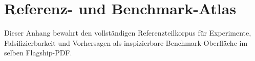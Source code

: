 \section{Referenz- und Benchmark-Atlas}
\label{sec:oc-core-1-3-reference-benchmark-atlas}

Dieser Anhang bewahrt den vollständigen Referenzteilkorpus für Experimente,
Falsifizierbarkeit und Vorhersagen als inspizierbare Benchmark-Oberfläche im
selben Flagship-PDF.

\begingroup
\let\ocappendixsection\section
\let\ocappendixsubsection\subsection
\let\ocappendixsubsubsection\subsubsection
\renewcommand{\section}{\ocappendixsubsection}
\renewcommand{\subsection}{\ocappendixsubsubsection}
\scriptsize
\RaggedRight
\sloppy

\endgroup
